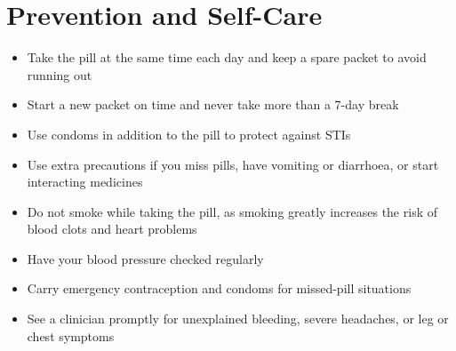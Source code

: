 \section*{Prevention and Self-Care}
\begin{itemize}
    \item Take the pill at the same time each day and keep a spare packet to avoid running out
    \item Start a new packet on time and never take more than a 7-day break
    \item Use condoms in addition to the pill to protect against STIs
    \item Use extra precautions if you miss pills, have vomiting or diarrhoea, or start interacting medicines
    \item Do not smoke while taking the pill, as smoking greatly increases the risk of blood clots and heart problems
    \item Have your blood pressure checked regularly
    \item Carry emergency contraception and condoms for missed-pill situations
    \item See a clinician promptly for unexplained bleeding, severe headaches, or leg or chest symptoms
\end{itemize}
